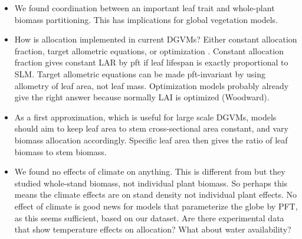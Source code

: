 \documentclass[a4paper]{article}\usepackage[]{graphicx}\usepackage[]{color}
\begin{document}
\begin{itemize}

\item We found coordination between an important leaf trait and whole-plant biomass partitioning. This has implications for global vegetation models.

\item How is allocation implemented in current DGVMs? Either constant allocation fraction, target allometric equations, or optimization \cite{de2014does}. Constant allocation fraction gives constant LAR by pft if leaf lifespan is exactly proportional to SLM. Target allometric equations can be made pft-invariant by using allometry of leaf area, not leaf mass. Optimization models probably already give the right answer because normally LAI is optimized (Woodward). 

\item As a first approximation, which is useful for large scale DGVMs, models should aim to keep leaf area to stem cross-sectional area constant, and vary biomass allocation accordingly. Specific leaf area then gives the ratio of leaf biomass to stem biomass. 

\item We found no effects of climate on anything. This is different from \cite{reich_temperature_2014} but they studied whole-stand biomass, not individual plant biomass. So perhaps this means the climate effects are on stand density not individual plant effects. No effect of climate is good news for models that parameterize the globe by PFT, as this seems sufficient, based on our dataset. Are there experimental data that show temperature effects on allocation? What about water availability?

\end{itemize}
\end{document}
